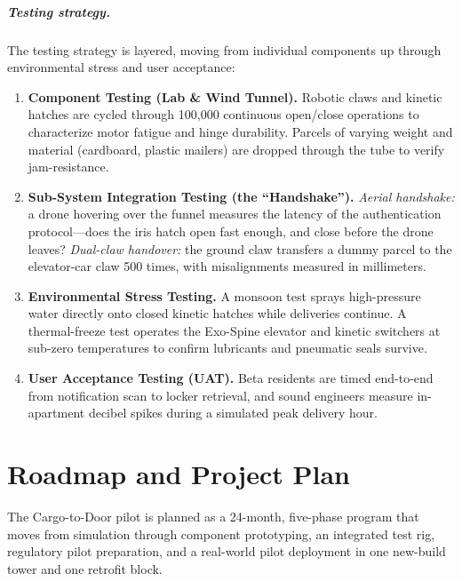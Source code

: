 \documentclass[11pt,a4paper]{report}
\begin{document}
\paragraph{Testing strategy.}
The testing strategy is layered, moving from individual components up
through environmental stress and user acceptance:

\begin{enumerate}
    \item \textbf{Component Testing (Lab \& Wind Tunnel).} Robotic
    claws and kinetic hatches are cycled through 100{,}000 continuous
    open/close operations to characterize motor fatigue and hinge
    durability. Parcels of varying weight and material (cardboard,
    plastic mailers) are dropped through the tube to verify
    jam-resistance.
    \item \textbf{Sub-System Integration Testing (the ``Handshake'').}
    \emph{Aerial handshake:} a drone hovering over the funnel
    measures the latency of the authentication protocol---does the
    iris hatch open fast enough, and close before the drone leaves?
    \emph{Dual-claw handover:} the ground claw transfers a dummy
    parcel to the elevator-car claw 500 times, with misalignments
    measured in millimeters.
    \item \textbf{Environmental Stress Testing.} A monsoon test sprays
    high-pressure water directly onto closed kinetic hatches while
    deliveries continue. A thermal-freeze test operates the
    Exo-Spine elevator and kinetic switchers at sub-zero temperatures
    to confirm lubricants and pneumatic seals survive.
    \item \textbf{User Acceptance Testing (UAT).} Beta residents are
    timed end-to-end from notification scan to locker retrieval, and
    sound engineers measure in-apartment decibel spikes during a
    simulated peak delivery hour.
\end{enumerate}

\chapter{Roadmap and Project Plan}
\label{ch:roadmap}

The Cargo-to-Door pilot is planned as a 24-month, five-phase program
that moves from simulation through component prototyping, an
integrated test rig, regulatory pilot preparation, and a real-world
pilot deployment in one new-build tower and one retrofit block.
\end{document}
